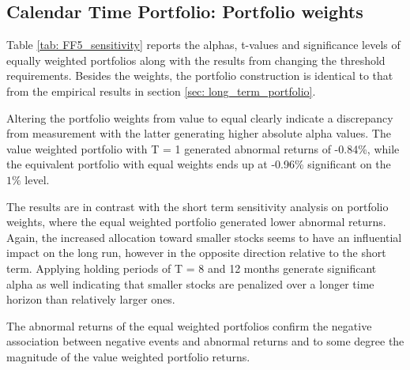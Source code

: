 \subsection{Calendar Time Portfolio: Portfolio weights}

Table \ref{tab: FF5_sensitivity} reports the alphas, t-values and significance levels of equally weighted portfolios along with the results from changing the threshold requirements. Besides the weights, the portfolio construction is identical to that from the empirical results in section \ref{sec: long_term_portfolio}. 

Altering the portfolio weights from value to equal clearly indicate a discrepancy from measurement with the latter generating higher absolute alpha values. The value weighted portfolio with T = 1 generated abnormal returns of -0.84\%, while the equivalent portfolio with equal weights ends up at -0.96\% significant on the $1\%$ level.   

The results are in contrast with the short term sensitivity analysis on portfolio weights, where the equal weighted portfolio generated lower abnormal returns. Again, the increased allocation toward smaller stocks seems to have an influential impact on the long run, however in the opposite direction relative to the short term. Applying holding periods of T = 8 and 12 months generate significant alpha as well indicating that smaller stocks are penalized over a longer time horizon than relatively larger ones.   

The abnormal returns of the equal weighted portfolios confirm the negative association between negative events and abnormal returns and to some degree the magnitude of the value weighted portfolio returns.

